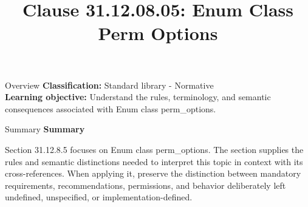 \documentclass[10pt,letterpaper]{article}
\title{Clause 31.12.08.05: Enum Class Perm Options}
\author{}
\date{}
\begin{document}
\maketitle
\begin{CornellOverviewBox}{Overview}
\textbf{Classification:} Standard library - Normative\\[2pt]
\textbf{Learning objective:} Understand the rules, terminology, and semantic consequences associated with Enum class perm\_options.
\end{CornellOverviewBox}\begin{CornellSummaryBox}{Summary}
{\sffamily\bfseries\color{Accent} Summary}\par\vspace{3pt}Section 31.12.8.5 focuses on Enum class perm\_options. The section supplies the rules and semantic distinctions needed to interpret this topic in context with its cross-references. When applying it, preserve the distinction between mandatory requirements, recommendations, permissions, and behavior deliberately left undefined, unspecified, or implementation-defined.
\end{CornellSummaryBox}
\end{document}
